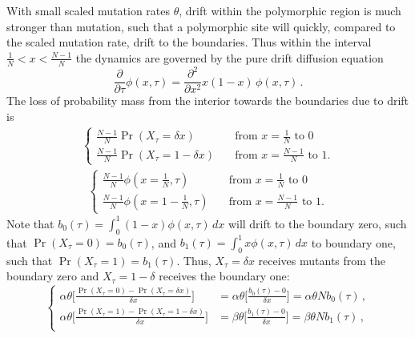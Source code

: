 \documentclass[preprint]{elsarticle}
\newcommand\x[1]{\ensuremath{X_{#1}}}
\begin{document}
With small scaled mutation rates $\theta$, drift within the polymorphic region is much stronger than mutation, such that a polymorphic site will quickly, compared to the scaled mutation rate, drift to the boundaries. Thus within the interval $\frac1N<x<\frac{N-1}N$ the dynamics are governed by the pure drift diffusion equation
\begin{equation}\label{eq:forw_drift}
  \frac{\partial}{\partial \tau} \phi(x,\tau) =\frac{\partial^2}{\partial x^2}x(1-x)\,\phi(x,\tau)\,.  
\end{equation}
The loss of probability mass from the interior towards the boundaries due to drift is 
\begin{align}\label{eq:forw_lossdrift}
  \begin{cases}
    \frac{N-1}N\Pr(\x{\tau}=\delta x)  \quad         & \text{from $x=\frac1N$ to 0}\\
    \frac{N-1}N\Pr(\x{\tau}=1-\delta x)  \quad         & \text{from $x=\frac{N-1}N$ to 1.}
\end{cases}
\end{align}
\begin{align}\label{eq:forw_lossdrift}
  \begin{cases}
    \frac{N-1}N\phi(x=\frac1N,\tau)  \quad         & \text{from $x=\frac1N$ to 0}\\
    \frac{N-1}N\phi(x=1-\frac1N,\tau)  \quad         & \text{from $x=\frac{N-1}N$ to 1.}
\end{cases}
\end{align}
Note that $b_0(\tau)=\int_0^1(1-x) \phi(x,\tau)\,dx$ will drift to the boundary zero, such that $\Pr(\x{\tau}=0)=b_0(\tau)$, and $b_1(\tau)=\int_0^1 x \phi(x,\tau)\,dx$ to boundary one, such that $\Pr(\x{\tau}=1)=b_1(\tau)$. Thus, $\x{\tau}=\delta x$ receives mutants from the boundary zero and  $\x{\tau}=1-\delta$ receives the boundary one:
\begin{equation}\label{eq:forw_gainmut}
\begin{cases}
\alpha\theta \bigg[\frac{\Pr(\x{\tau}=0) - \Pr(\x{\tau}=\delta x)}{\delta x}\bigg]&=\alpha\theta \bigg[\frac{b_0(\tau) - 0}{\delta x}\bigg]=\alpha\theta N b_0(\tau)\,,\\
\alpha\theta \bigg[\frac{\Pr(\x{\tau}=1) - \Pr(\x{\tau}=1-\delta x)}{\delta x}\bigg]&=\beta\theta \bigg[\frac{b_1(\tau) - 0}{\delta x}\bigg]=\beta\theta N b_1(\tau)\,,\\
\end{cases}
\end{equation}
\end{document}
